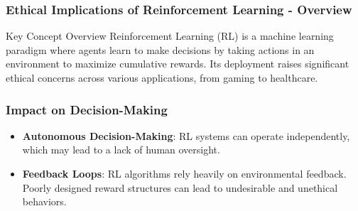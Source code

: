 \documentclass[aspectratio=169]{beamer}
\begin{document}
\begin{frame}[fragile]
    \frametitle{Ethical Implications of Reinforcement Learning - Overview}
    \begin{block}{Key Concept Overview}
        Reinforcement Learning (RL) is a machine learning paradigm where agents learn to make decisions by taking actions in an environment to maximize cumulative rewards. Its deployment raises significant ethical concerns across various applications, from gaming to healthcare.
    \end{block}
\end{frame}

\begin{frame}[fragile]
    \frametitle{Impact on Decision-Making}
    \begin{itemize}
        \item \textbf{Autonomous Decision-Making}: RL systems can operate independently, which may lead to a lack of human oversight.
        
        \item \textbf{Feedback Loops}: RL algorithms rely heavily on environmental feedback. Poorly designed reward structures can lead to undesirable and unethical behaviors.
    \end{itemize}
\end{frame}
\end{document}
